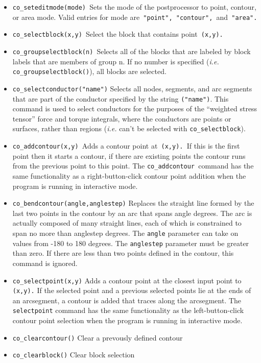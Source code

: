 \begin{itemize}
\item \texttt{co\_seteditmode(mode) }Sets the mode of the postprocessor to point,
contour, or area mode. Valid entries for mode are\texttt{ "point",
"contour", }and\texttt{ "area". }

\item \texttt{co\_selectblock(x,y) }Select the block that contains point\texttt{
(x,y).}

\item \texttt{co\_groupselectblock(n) }Selects all of the blocks that are labeled by
block labels that are members of group n. If no number is specified
({\em i.e.} \texttt{co\_groupselectblock()}), all blocks are selected.

\item \texttt{co\_selectconductor("name")} Selects all nodes, segments, and arc
segments that are part of the conductor specified by the string
\texttt{("name")}. This command is used to select conductors for the
purposes of the ``weighted stress tensor'' force and torque
integrals, where the conductors are points or surfaces, rather than
regions ({\em i.e.} can't be selected with \texttt{co\_selectblock}).

\item \texttt{co\_addcontour(x,y) }Adds a contour point at\texttt{ (x,y). }If this is
the first point then it starts a contour, if there are existing
points the contour runs from the previous point to this point. The
\texttt{co\_addcontour }command has the same functionality as a
right-button-click contour point addition when the program is
running in interactive mode.\texttt{ }

\item \texttt{co\_bendcontour(angle,anglestep)} Replaces the straight line formed by
the last two points in the contour by an arc that spans angle
degrees. The arc is actually composed of many straight lines, each
of which is constrained to span no more than anglestep degrees. The
\texttt{angle} parameter can take on values from -180 to 180
degrees. The \texttt{anglestep} parameter must be greater than
zero. If there are less than two points defined in the contour,
this command is ignored.

\item \texttt{co\_selectpoint(x,y)} Adds a contour point at the closest input point to
\texttt{(x,y).} If the selected point and a previous selected points lie at
the ends of an arcsegment, a contour is added that traces along the
arcsegment. The \texttt{selectpoint} command has the same
functionality as the left-button-click contour point selection when
the program is running in interactive mode.

\item \texttt{co\_clearcontour()} Clear a prevously defined contour

\item \texttt{co\_clearblock()} Clear block selection
\end{itemize}



